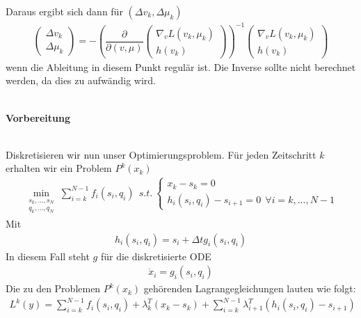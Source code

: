 \documentclass[12pt,a4paper]{article}
\begin{document}
  Daraus ergibt sich dann für $ ( \Delta v_{k} , \Delta \mu_{k} ) $
  \begin{align*} 
  \left( \begin{array}{c} \Delta v_{k} \\ \Delta \mu_{k}  \end{array} \right) = - \left(  \dfrac{\partial}{\partial (v,\mu)}
  \left( \begin{array}{c} \nabla_{v} L(v_{k},\mu_{k}) \\ h(v_{k}) \end{array} \right) \right) ^{-1}
  \left( \begin{array}{c} \nabla_{v} L(v_{k},\mu_{k}) \\ h(v_{k}) \end{array} \right)  
  \end{align*}
  wenn die Ableitung in diesem Punkt regulär ist. Die Inverse sollte nicht berechnet werden, da dies zu aufwändig wird.
  \\
  \\
  \begin{large}
  \textbf{Vorbereitung}
  \end{large} \\
  Diskretisieren wir nun unser Optimierungsproblem. Für jeden Zeitschritt $k$ erhalten wir ein Problem $ P^k (x_k) $
  \begin{align*}
  \min_{\begin{array}{c} s_{k},...,s_{N}\\ q_{k},...,q_{N} \end{array}} \sum_{i=k}^{N-1} f_{i}(s_{i},q_{i}) \ \  
  s.t. \ \left\lbrace \begin{array}{c}
  x_{k} - s_{k} = 0 \\
  h_i (s_i ,q_i ) - s_{i+1} = 0 \ \ \forall i = k, ... , N-1 \end{array} \right. 
  \end{align*}
  Mit 
  \begin{align*}
  h_i (s_i ,q_i ) = s_{i} + \Delta t g_{i}(s_{i},q_{i})
  \end{align*}
  In diesem Fall steht $ g $ für die diskretisierte ODE
  \begin{align*}
  \dot{x}_{i} = g_{i} (s_{i},q_{i})
  \end{align*}
  Die zu den Problemen $ P^{k}(x_{k}) $ gehörenden Lagrangegleichungen lauten wie folgt:
  \begin{align*}
  L^{k}(y) = \sum_{i=k}^{N-1} f_{i}(s_{i},q_{i})
  + \lambda_{k}^{T}(x_{k} - s_{k})
  + \sum_{i=k}^{N-1} \lambda_{i+1}^{T} (h_i (s_i ,q_i ) - s_{i+1})
  \end{align*}
\end{document}
